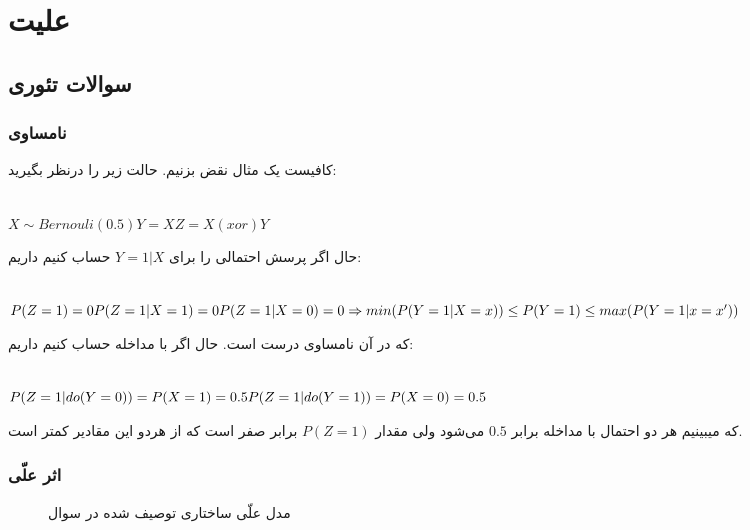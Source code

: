 \def \Subject {علیت}
\def \Session { دو}
\renewcommand{\chaptername}{سوال}
\chapter{\Subject}

\section{سوالات تئوری}

\subsection{نامساوی}
کافیست یک مثال نقض بزنیم. حالت زیر را درنظر بگیرید:
\begin{latin}
	~\\
	$
	X \sim Bernouli(0.5)
	Y = X
	Z = X (xor) Y
	$
\end{latin}
حال اگر پرسش احتمالی را برای 
$Y = 1 | X$ 
حساب کنیم داریم:

\begin{latin}
	~\\
	$
P(Z = 1)  = 0 \\
P(Z = 1 | X = 1) = 0  \\
P(Z = 1 | X = 0) = 0
\Rightarrow min(P(Y = 1 | X = x)) \leq P(Y = 1) \leq max(P(Y = 1 | x = x')) 
	$
\end{latin}
که در آن نامساوی درست است. حال اگر با مداخله حساب کنیم داریم:
\begin{latin}
	~\\
	$
	P(Z = 1 | do(Y = 0 )) = P(X = 1) = 0.5 \\
	P(Z = 1 | do(Y = 1)) = P(X = 0) = 0.5
	$
\end{latin}
که میبینیم هر دو احتمال با مداخله برابر 
$0.5$
می‌شود ولی مقدار
$P(Z = 1)$
برابر صفر است که از هردو این مقادیر کمتر است.

\subsection{اثر علّی}

\begin{figure}[H]
	\centering
	\caption{مدل علّی ساختاری توصیف شده در سوال}
	\label{q2:scm1}
\end{figure}

